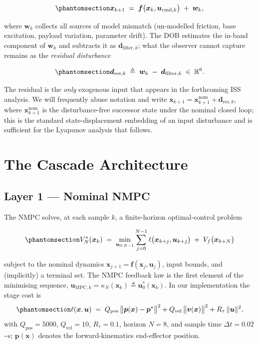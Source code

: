 \documentclass[
  11pt,
]{article}
\theoremstyle{plain}
\theoremstyle{plain}
\theoremstyle{definition}
\theoremstyle{remark}
\begin{document}
\begin{equation}\protect\phantomsection\label{eq-plant}{
\bm{x}_{k+1} \;=\; \bm{f}\bigl(\bm{x}_k,\bm{u}_{\mathrm{cmd},k}\bigr)
\;+\; \bm{w}_k,
}\end{equation}

where \(\bm{w}_k\) collects all sources of model mismatch (un-modelled
friction, base excitation, payload variation, parameter drift). The DOB
estimates the in-band component of \(\bm{w}_k\) and subtracts it as
\(\bm{d}_{\mathrm{filter},k}\); what the observer cannot capture remains
as the \emph{residual disturbance}

\begin{equation}\protect\phantomsection\label{eq-dres-def}{
\bm{d}_{\mathrm{res},k} \;\triangleq\;
\bm{w}_k \;-\; \bm{d}_{\mathrm{filter},k}
\;\in\;\mathbb{R}^6.
}\end{equation}

The residual is the \emph{only} exogenous input that appears in the
forthcoming ISS analysis. We will frequently abuse notation and write
\(\bm{x}_{k+1} = \bm{x}_{k+1}^{\mathrm{nom}} + \bm{d}_{\mathrm{res},k}\),
where \(\bm{x}_{k+1}^{\mathrm{nom}}\) is the disturbance-free successor
state under the nominal closed loop; this is the standard
state-displacement embedding of an input disturbance and is sufficient
for the Lyapunov analysis that follows.

\section{The Cascade Architecture}\label{sec-cascade}

\subsection{Layer 1 --- Nominal NMPC}\label{sec-nmpc}

The NMPC solves, at each sample \(k\), a finite-horizon optimal-control
problem

\begin{equation}\protect\phantomsection\label{eq-vstar}{
V_N^*(\bm{x}_k)
\;=\;
\min_{\bm{u}_{0:N-1}}
\sum_{j=0}^{N-1} \ell\bigl(\bm{x}_{k+j},\bm{u}_{k+j}\bigr)
\;+\; V_f\bigl(\bm{x}_{k+N}\bigr)
}\end{equation}

subject to the nominal dynamics
\(\bm{x}_{j+1}=\bm{f}(\bm{x}_j,\bm{u}_j)\), input bounds, and
(implicitly) a terminal set. The NMPC feedback law is the first element
of the minimising sequence,
\(\bm{u}_{\mathrm{MPC},k} = \kappa_N(\bm{x}_k) \triangleq
\bm{u}^*_{0}(\bm{x}_k)\). In our implementation the stage cost is
\begin{equation}\protect\phantomsection\label{eq-stage}{
\ell(\bm{x},\bm{u}) \;=\;
Q_{\mathrm{pos}}\,\bigl\|\bm{p}(\bm{x})-\bm{p}^{\star}\bigr\|^2
+ Q_{\mathrm{vel}}\,\bigl\|\bm{v}(\bm{x})\bigr\|^2
+ R_{\tau}\,\|\bm{u}\|^2,
}\end{equation} with \(Q_{\mathrm{pos}}=5000\), \(Q_{\mathrm{vel}}=10\),
\(R_{\tau}=0.1\), horizon \(N=8\), and sample time
\(\Delta t = 0.02\)\textasciitilde s; \(\bm{p}(\bm{x})\) denotes the
forward-kinematics end-effector position.
\end{document}
